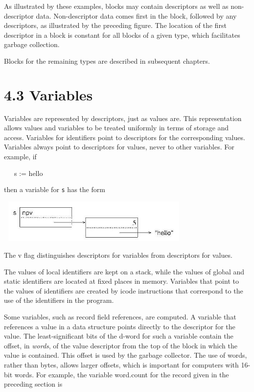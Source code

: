 As illustrated by these examples, blocks may contain descriptors as
well as non-descriptor data. Non-descriptor data comes first in the
block, followed by any descriptors, as illustrated by the preceding
figure. The location of the first descriptor in a block is constant
for all blocks of a given type, which facilitates garbage collection.

Blocks for the remaining types are described in subsequent chapters.

\section[4.3 Variables]{4.3 Variables}

Variables are represented by descriptors, just as values are. This
representation allows values and variables to be treated uniformly in
terms of storage and access. Variables for identifiers point to
descriptors for the corresponding values. Variables always point to
descriptors for values, never to other variables. For example, if

{\ttfamily\mdseries
\ \ \ s := {\textquotedbl}hello{\textquotedbl}}

\noindent then a variable for \texttt{s} has the form

\begin{center}
\includegraphics[width=3.8193in,height=0.8492in]{ib-img/ib-img013.jpg}
\end{center}

The v flag distinguishes descriptors for variables from descriptors for values.

The values of local identifiers are kept on a stack, while the values
of global and static identifiers are located at fixed places in
memory. Variables that point to the values of identifiers are created
by icode instructions that correspond to the use of the identifiers in
the program.

Some variables, such as record field references, are computed. A
variable that references a value in a data structure points directly
to the descriptor for the value. The least-significant bits of the
d-word for such a variable contain the offset, in \textit{words}, of
the value descriptor from the top of the block in which the value is
contained. This offset is used by the garbage collector. The use of
words, rather than bytes, allows larger offsets, which is important
for computers with 16-bit words. For example, the variable word.count
for the record given in the preceding section is

